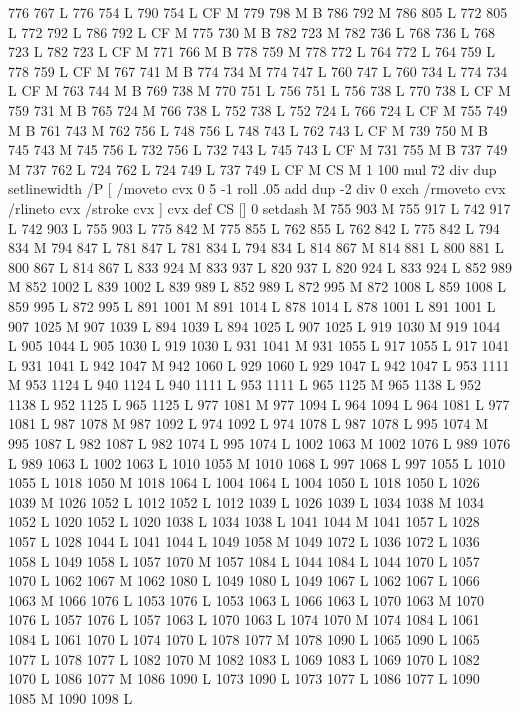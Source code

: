 {{{{{{{{{{{{{{{{{{{{{{{{{{{776 767 L
776 754 L
790 754 L
CF M
779 798 M B
786 792 M 786 805 L
772 805 L
772 792 L
786 792 L
CF M
775 730 M B
782 723 M 782 736 L
768 736 L
768 723 L
782 723 L
CF M
771 766 M B
778 759 M 778 772 L
764 772 L
764 759 L
778 759 L
CF M
767 741 M B
774 734 M 774 747 L
760 747 L
760 734 L
774 734 L
CF M
763 744 M B
769 738 M 770 751 L
756 751 L
756 738 L
770 738 L
CF M
759 731 M B
765 724 M 766 738 L
752 738 L
752 724 L
766 724 L
CF M
755 749 M B
761 743 M 762 756 L
748 756 L
748 743 L
762 743 L
CF M
739 750 M B
745 743 M 745 756 L
732 756 L
732 743 L
745 743 L
CF M
731 755 M B
737 749 M 737 762 L
724 762 L
724 749 L
737 749 L
CF M
CS M 1 100 mul 72 div dup setlinewidth
/P [ /moveto cvx 0 5 -1 roll .05 add dup -2 div 0 exch /rmoveto cvx /rlineto cvx /stroke cvx ] cvx def
CS [] 0 setdash M
755 903 M 755 917 L
742 917 L
742 903 L
755 903 L
775 842 M 775 855 L
762 855 L
762 842 L
775 842 L
794 834 M 794 847 L
781 847 L
781 834 L
794 834 L
814 867 M 814 881 L
800 881 L
800 867 L
814 867 L
833 924 M 833 937 L
820 937 L
820 924 L
833 924 L
852 989 M 852 1002 L
839 1002 L
839 989 L
852 989 L
872 995 M 872 1008 L
859 1008 L
859 995 L
872 995 L
891 1001 M 891 1014 L
878 1014 L
878 1001 L
891 1001 L
907 1025 M 907 1039 L
894 1039 L
894 1025 L
907 1025 L
919 1030 M 919 1044 L
905 1044 L
905 1030 L
919 1030 L
931 1041 M 931 1055 L
917 1055 L
917 1041 L
931 1041 L
942 1047 M 942 1060 L
929 1060 L
929 1047 L
942 1047 L
953 1111 M 953 1124 L
940 1124 L
940 1111 L
953 1111 L
965 1125 M 965 1138 L
952 1138 L
952 1125 L
965 1125 L
977 1081 M 977 1094 L
964 1094 L
964 1081 L
977 1081 L
987 1078 M 987 1092 L
974 1092 L
974 1078 L
987 1078 L
995 1074 M 995 1087 L
982 1087 L
982 1074 L
995 1074 L
1002 1063 M 1002 1076 L
989 1076 L
989 1063 L
1002 1063 L
1010 1055 M 1010 1068 L
997 1068 L
997 1055 L
1010 1055 L
1018 1050 M 1018 1064 L
1004 1064 L
1004 1050 L
1018 1050 L
1026 1039 M 1026 1052 L
1012 1052 L
1012 1039 L
1026 1039 L
1034 1038 M 1034 1052 L
1020 1052 L
1020 1038 L
1034 1038 L
1041 1044 M 1041 1057 L
1028 1057 L
1028 1044 L
1041 1044 L
1049 1058 M 1049 1072 L
1036 1072 L
1036 1058 L
1049 1058 L
1057 1070 M 1057 1084 L
1044 1084 L
1044 1070 L
1057 1070 L
1062 1067 M 1062 1080 L
1049 1080 L
1049 1067 L
1062 1067 L
1066 1063 M 1066 1076 L
1053 1076 L
1053 1063 L
1066 1063 L
1070 1063 M 1070 1076 L
1057 1076 L
1057 1063 L
1070 1063 L
1074 1070 M 1074 1084 L
1061 1084 L
1061 1070 L
1074 1070 L
1078 1077 M 1078 1090 L
1065 1090 L
1065 1077 L
1078 1077 L
1082 1070 M 1082 1083 L
1069 1083 L
1069 1070 L
1082 1070 L
1086 1077 M 1086 1090 L
1073 1090 L
1073 1077 L
1086 1077 L
1090 1085 M 1090 1098 L
}}}}}}}}}}}}}}}}}}}}}}}}}}}
